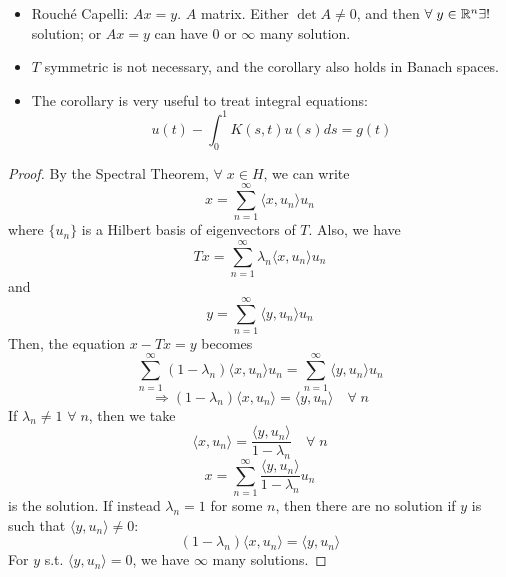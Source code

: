 \begin{remark}
    \begin{itemize}
        \item Rouché Capelli: \(Ax = y\). \(A\) matrix. Either \(\det A \neq 0\), and then \(\forall\; y \in \mathbb{R}^n \exists!\; \) solution; or \(Ax = y\) can have \(0\) or \(\infty \) many solution.
        \item \(T\) symmetric is not necessary, and the corollary also holds in Banach spaces. 
        \item The corollary is very useful to treat integral equations:
        \[
            u(t) - \int_0^1 K(s, t) u(s) ds = g(t)
        \]
    \end{itemize}
\end{remark}
\begin{proof}
    By the Spectral Theorem, \(\forall \; x \in H\), we can write 
    \[
        x = \sum_{n=1}^\infty \langle x, u_n\rangle u_n
    \] 
    where \(\{u_n \}\) is a Hilbert basis of eigenvectors of \(T\). Also, we have 
    \[
        Tx = \sum_{n=1}^\infty \lambda_n \langle x, u_n\rangle u_n
    \]
    and 
    \[
        y = \sum_{n=1}^\infty \langle y, u_n\rangle u_n
    \]
    Then, the equation \(x - Tx = y\) becomes
    \[
        \sum_{n=1}^\infty (1- \lambda_n) \langle x, u_n\rangle u_n = \sum_{n=1}^\infty \langle y, u_n \rangle u_n
    \]
    \[
        \Rightarrow (1 - \lambda_n) \langle x, u_n\rangle = \langle y, u_n\rangle \quad \forall\; n
    \]
    If \(\lambda_n \neq 1\) \(\forall \; n\), then we take 
    \[
        \langle x, u_n\rangle = \frac{\langle y, u_n \rangle}{1 - \lambda_n} \quad \forall\; n
    \]
    \[
        x = \sum_{n=1}^\infty \frac{\langle y, u_n\rangle}{1 - \lambda_n} u_n
    \]
    is the solution. If instead \(\lambda_n = 1\) for some \(n\), then there are no solution if \(y\) is such that \(\langle y, u_n\rangle \neq 0\):
    \[
        (1 - \lambda_n) \langle x, u_n\rangle = \langle y, u_n\rangle
    \]
    For \(y\) s.t. \(\langle y, u_n\rangle = 0\), we have \(\infty\) many solutions.
\end{proof}